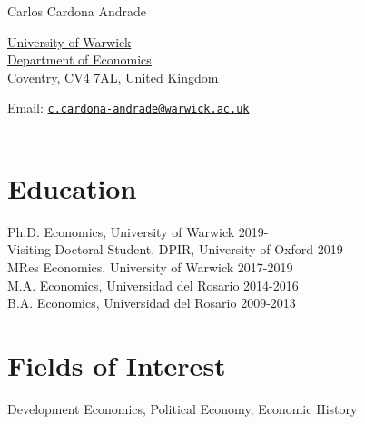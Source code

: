 \documentclass[10pt,letterpaper]{article}
\def\name{Carlos Cardona Andrade}
\renewenvironment{itemize}{
  \begin{list}{}{
    \setlength{\leftmargin}{1.5em}
  }
}{
  \end{list}
}
\begin{document}
{\huge \name}


\vspace{0.25in}

\begin{minipage}[t]{0.5\textwidth}
  \href{https://warwick.ac.uk/}{University of Warwick} \\
  \href{https://warwick.ac.uk/fac/soc/economics/}{Department of Economics} \\
  Coventry, CV4 7AL, United Kingdom\\
\end{minipage}
\begin{minipage}[t]{0.5\textwidth}
  Email: \href{mailto:C.Cardona-Andrade@warwick.ac.uk}{\tt c.cardona-andrade@warwick.ac.uk}\\
 \\
\end{minipage}


\section*{Education}

\begin{itemize}
  \item Ph.D. Economics, University of Warwick \hfill 2019-\\
  Visiting Doctoral Student, DPIR, University of Oxford \hfill 2019 \\ 
   MRes Economics, University of Warwick \hfill 2017-2019\\
   M.A. Economics, Universidad del Rosario \hfill 2014-2016\\
B.A. Economics, Universidad del Rosario \hfill 2009-2013
\end{itemize}

\section*{Fields of Interest}
\begin{itemize}
    \item Development Economics, Political Economy, Economic History

\end{itemize}
\end{document}
